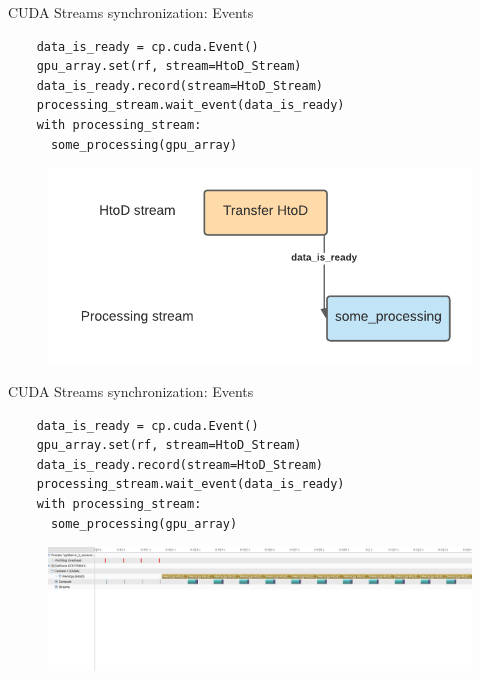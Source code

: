 \documentclass[xcolor=table]{beamer}
\begin{document}
\begin{frame}[fragile]{CUDA Streams synchronization: Events}

\begin{lstlisting}
    data_is_ready = cp.cuda.Event()
    gpu_array.set(rf, stream=HtoD_Stream) 
    data_is_ready.record(stream=HtoD_Stream) 
    processing_stream.wait_event(data_is_ready) 
    with processing_stream:
      some_processing(gpu_array)
\end{lstlisting}


  \begin{figure}
    \includegraphics[scale=0.8]{imgs/events.png}
  \end{figure}  

\end{frame}


\begin{frame}[fragile]{CUDA Streams synchronization: Events}

  \begin{lstlisting}
    data_is_ready = cp.cuda.Event()
    gpu_array.set(rf, stream=HtoD_Stream) 
    data_is_ready.record(stream=HtoD_Stream) 
    processing_stream.wait_event(data_is_ready) 
    with processing_stream:
      some_processing(gpu_array)
  \end{lstlisting}


  \begin{figure}
    \includegraphics[scale=0.2]{imgs/concurrent_streams_sync.png}
  \end{figure}  

\end{frame}
\end{document}

